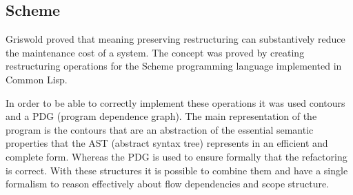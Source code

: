 
\subsection{Scheme}

Griswold \cite{griswold1991program} proved that meaning preserving restructuring can substantively reduce the maintenance cost of a system.
The concept was proved by creating restructuring operations for the Scheme programming language implemented in Common Lisp.





In order to be able to correctly implement these operations it was used contours and a PDG (program dependence graph). 
The main representation of the program is the contours that are an abstraction of the essential semantic properties that the AST (abstract syntax tree) represents in an efficient and complete form.
Whereas the PDG is used to ensure formally that the refactoring is correct.
With these structures it is possible to combine them and have a single formalism to reason effectively about flow dependencies and scope structure.

